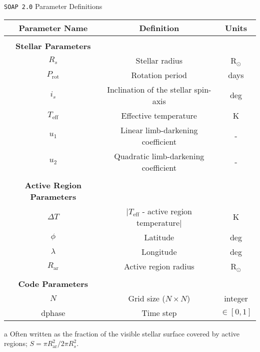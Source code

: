 \begin{threeparttable}
\caption{\texttt{SOAP 2.0} Parameter Definitions}
\label{table:soap}
\begin{tabular}{ccc}
  \hline
  \hline
  \textbf{Parameter Name} & \textbf{Definition} & \textbf{Units} \\
  \hline
  && \\
  \textbf{Stellar Parameters} & & \\
  \hline
  $R_s$ & Stellar radius & R$_{\odot}$ \\
  $P_{\mathrm{rot}}$ & Rotation period & days \\
  $i_s$ & Inclination of the stellar spin-axis & deg \\
  $T_{\mathrm{eff}}$ & Effective temperature & K \\
  $u_1$ & Linear limb-darkening coefficient & - \\
  $u_2$ & Quadratic limb-darkening coefficient & - \\
  \hline
  && \\
  \textbf{Active Region Parameters} && \\
  \hline
  $\Delta T$ & $|T_{\mathrm{eff}}$ - active region temperature$|$ & K \\ 
  $\phi$ & Latitude & deg \\
  $\lambda$ & Longitude & deg \\
  $R_{\mathrm{ar}}$ & Active region radius\tnote{a} & R$_{\odot}$ \\
  \hline
  && \\
  \textbf{Code Parameters} && \\
  \hline
  $N$ & Grid size ($N \times N$) & integer \\ 
  dphase & Time step & $\in [0,1]$ 
  \end{tabular}
\begin{tablenotes}
\item[a] Often written as the fraction of the visible stellar surface covered 
  by active regions; $S=\pi R_{\mathrm{ar}}^2 / 2\pi R_s^2$.
\end{tablenotes}
\end{threeparttable}
